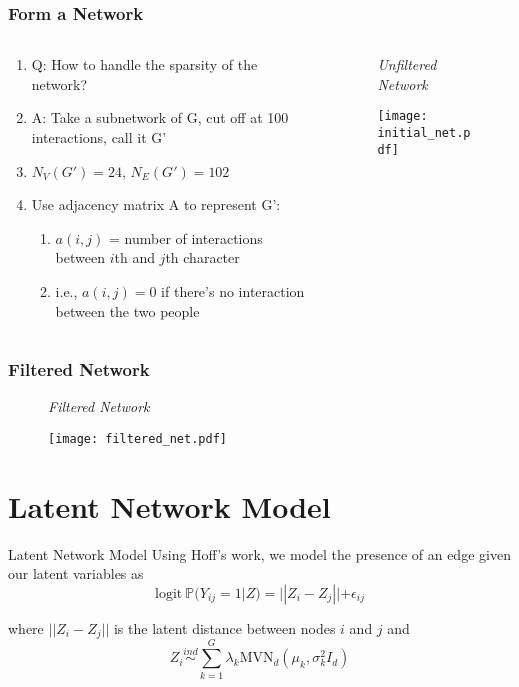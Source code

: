 \documentclass{beamer}
\begin{document}
\begin{frame}
\frametitle{Form a Network}

\begin{minipage}{\textwidth}
\begin{columns}[T]
\begin{column}{0.4\textwidth}
\begin{enumerate}[a]
\item Q: How to handle the sparsity of the network? 
\item A: Take a subnetwork of G, cut off at 100 interactions, call it G'
\item $N_V (G')= 24$, $N_E (G') = 102$
\item Use adjacency matrix A to represent G': 
 \begin{enumerate}[i]
  \item $a(i, j)$ = number of interactions between $i$th and $j$th character
  \item  i.e., $a(i, j) = 0$ if there's no interaction between the two people
 \end{enumerate}
\end{enumerate}
\end{column}
\begin{column}{0.6\textwidth}
\begin{figure}
\textit{Unfiltered Network}\par
\centering
\texttt{[image: initial\_net.pdf]}
\end{figure}
\end{column}
\end{columns}
\end{minipage}
\end{frame} 


\begin{frame}
\frametitle{Filtered Network}
\begin{figure}
\textit{Filtered Network}\par
\centering
\texttt{[image: filtered\_net.pdf]}
\end{figure}

\end{frame} 


%
%

\section{Latent Network Model}
\begin{frame}{Latent Network Model}
Using Hoff's work, we model the presence of an edge given our latent variables as
\[\text{logit} \ \mathbb{P}(Y_{ij} = 1|Z) = ||Z_i - Z_j|| + \epsilon_{ij}\]

where $||Z_i - Z_j||$ is the latent distance between nodes $i$ and $j$ and 
\[Z_i \overset{ind}{\sim}\sum_{k=1}^G \lambda_k\text{MVN}_d(\mu_k,\sigma_k^2I_d)\]

\end{frame}
\end{document}

